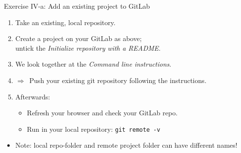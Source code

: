 \documentclass[aspectratio=169]{beamer}
\newcommand{\dra}{\ensuremath{\Rightarrow }~}
\newcommand{\code}[1]{\texttt{\color{mygreen}#1}}
\begin{document}
\begin{frame}
  {Exercise IV-a: Add an existing project to GitLab}

  \begin{enumerate}\itemsep0.2cm
    \item Take an existing, local repository.
    \item Create a project on your GitLab as above;\\
      \alert{untick} the \emph{Initialize repository with a README}.
    \item We look together at the \emph{Command line instructions}.
    \item \dra Push your existing git repository following the instructions.
    \item Afterwards:
      \begin{itemize}
        \item Refresh your browser and check your GitLab repo.
        \item Run in your local repository: \code{git remote -v}
      \end{itemize}
  \end{enumerate}

  \begin{itemize}
    \item Note: local repo-folder and remote project folder can have different
      names!
  \end{itemize}

\end{frame}
\end{document}
